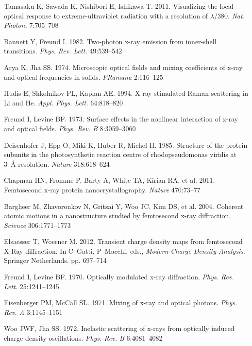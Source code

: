 \documentclass{ar-1col}
\begin{document}
\begin{thebibliography}{000}
Tamasaku K, Sawada K, Nishibori E, Ishikawa T. 2011. Visualizing the local
  optical response to extreme-ultraviolet radiation with a resolution of
  $\lambda$/380. \textit{Nat. Photon.} 7:705--708

Bannett Y, Freund I. 1982. {Two-photon} {x-ray} emission from {inner-shell}
  transitions. \textit{Phys. Rev. Lett.} 49:539--542

Arya K, Jha SS. 1974. Microscopic optical fields and mixing coefficients of
  {x-ray} and optical frequencies in solids. \textit{P{R}amana} 2:116--125

Hudis E, Shkolnikov PL, Kaplan AE. 1994. {X-r}ay stimulated {R}aman scattering
  in {Li} and {He}. \textit{Appl. Phys. Lett.} 64:818--820

Freund I, Levine BF. 1973. Surface effects in the nonlinear interaction of
  {x-ray} and optical fields. \textit{Phys. Rev. B} 8:3059--3060

Deisenhofer J, Epp O, Miki K, Huber R, Michel H. 1985. Structure of the protein
  subunits in the photosynthetic reaction centre of rhodopseudomonas viridis at
  {3~{\AA}} resolution. \textit{Nature} 318:618--624

Chapman HN, Fromme P, Barty A, White TA, Kirian RA, et al. 2011. Femtosecond x-ray protein nanocrystallography.
  \textit{Nature} 470:73--77

Bargheer M, Zhavoronkov N, Gritsai Y, Woo JC, Kim DS, et al.
  2004. Coherent atomic motions in a nanostructure studied by femtosecond x-ray
  diffraction. \textit{Science} 306:1771--1773

Elsaesser T, Woerner M. 2012. Transient charge density maps from femtosecond
  {X-Ray} diffraction. In C~Gatti, P~Macchi, eds., \textit{Modern
  {Charge-Density} Analysis}. Springer Netherlands. pp. 697--714

Freund I, Levine BF. 1970. Optically modulated {x-ray} diffraction.
  \textit{Phys. Rev. Lett.} 25:1241--1245

Eisenberger PM, {McCall} SL. 1971. Mixing of {x-ray} and optical photons.
  \textit{Phys. Rev. A} 3:1145--1151

Woo JWF, Jha SS. 1972. Inelastic scattering of x-rays from optically induced
  {charge-density} oscillations. \textit{Phys. Rev. B} 6:4081--4082


\end{thebibliography}
\end{document}
